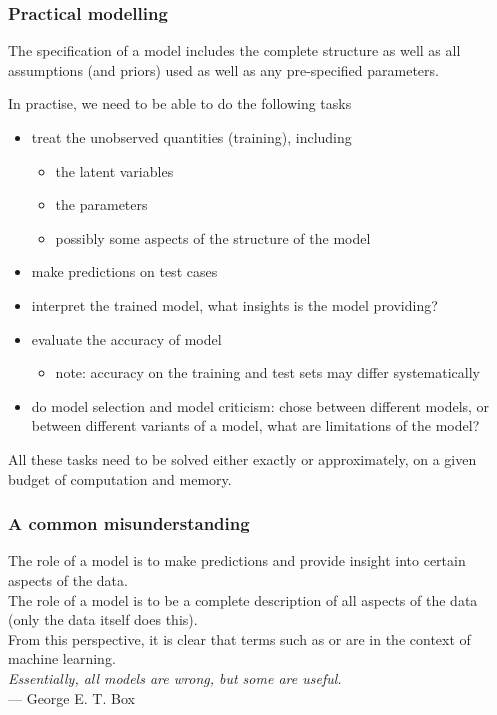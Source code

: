 \begin{frame}
\frametitle{Practical modelling}

The specification of a model includes the complete structure as well as all assumptions (and priors) used as well as any pre-specified parameters. 

In practise, we need to be able to do the following tasks
\begin{itemize}
\item treat the unobserved quantities (training), including
\begin{itemize}
\item the latent variables
\item the parameters
\item possibly some aspects of the structure of the model
\end{itemize}
\item make predictions on test cases
\item interpret the trained model, what insights is the model providing?
\item evaluate the accuracy of model
\begin{itemize}
\item note: accuracy on the training and test sets may differ systematically
\end{itemize}
\item do model selection and model criticism: chose between different models, or between different variants of a model, what are limitations of the model?
\end{itemize}

All these tasks need to be solved either exactly or approximately, on a given budget
of computation and memory.
\end{frame}

\begin{frame}
\frametitle{A common misunderstanding}

The role of a model is to make predictions and provide insight into certain aspects of the data.\\[1ex]

The role of a model is  to be a complete description of all aspects of the data (only the data itself does this).\\[1ex]

From this perspective, it is clear that terms such as  or  are  in the context of machine learning.\\[2ex]

\emph{Essentially, all models are wrong, but some are useful.}\\
\hfill --- George E. T. Box
\end{frame}

  